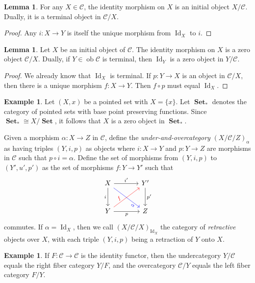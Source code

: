 \documentclass[10pt,letterpaper,cm]{nupset}
\theoremstyle{definition}
\newtheorem{exmp}[definition]{Example}
\theoremstyle{theorem}
\newtheorem{lemma}[definition]{Lemma}
\theoremstyle{remark}
\newcommand{\1}{\mathbf{1}}
\renewcommand{\c}{\mathscr{C}}
\newcommand{\0}{\vec 0}
\DeclareMathOperator{\id}{Id}
\DeclareMathOperator{\ob}{ob}
\DeclareMathOperator{\set}{\mathbf{Set}}
\begin{document}
\begin{lemma}
For any $X \in \c$, the identity morphism on $X$ is an initial object ${X}/{\c}$. Dually, it is a terminal object in ${\c}/{X}$.
\end{lemma}
\begin{proof}
Any $i: X \to Y$ is itself the unique morphism from $\id_X$ to $i$.
\end{proof}

\begin{lemma}
Let $X$ be an initial object of $\c$. The identity morphism on $X$ is a zero object ${\c}/{X}$. Dually, if $Y \in \ob \c$ is terminal, then $\id_Y$ is a zero object in ${Y}/{\c}$.
\end{lemma}
\begin{proof}
We already know that $\id_X$ is terminal. If $p: Y \to X$ is an object in ${\c}/{X}$, then there is a unique morphism $f: X \to Y$. Then $f\circ p$ must equal $\id_X$.
\end{proof}

\begin{exmp}
Let $\left(X, x\right)$ be a pointed set with $X= \{x\}$. Let $\set_{\ast}$ denotes the category of pointed sets with base point preserving functions. Since  $\set_{\ast} \cong {X}/{\set}$, it follows that $X$ is a zero object in $\set_{\ast}$.
\end{exmp}

\smallskip

Given a morphism $\alpha : X \to Z$ in $\c$, define the \textit{under-and-overcategory} $\left(X/\c/Z\right)_{\alpha}$ as having triples $\left(Y, i, p\right)$ as objects where $i : X \to Y$ and $p: Y \to Z$ are morphisms in $\c$ such that $p\circ i = \alpha$. Define the set of morphisms from $\left(Y, i, p\right)$ to $\left(Y', u', p'\right)$ as the set of morphisms $f: Y \to Y'$ such that 
\[
\begin{tikzcd}[row sep=large, column sep=large]
X \arrow[to=Z, "i ", swap] \arrow[to=2-2, dr, blue, sloped,pos=.8, "\alpha", swap]
& Y' \arrow[to=2-2, "p' "] \\
|[alias=Z]| Y \arrow[to=1-2, ur, red, sloped,pos=.3, "f"] \arrow[to=2-2, "p"'] 
& Z
\arrow[from=ul, to=1-2, "i' "]
\end{tikzcd}
\]
commutes. If $\alpha = \id_X$, then we call $\left(X/\c/X\right)_{\id_X}$ the category of \textit{retractive} objects over $X$, with each triple $\left(Y, i, p\right)$ being a retraction of $Y$ onto $X$.


\begin{exmp}
If $F: \c \to \c$ is the identity functor, then the undercategory $Y/\c$ equals the right fiber category $Y/F$, and the overcategory $\c/Y$ equals the left fiber category $F/Y$.
\end{exmp}
\end{document}
